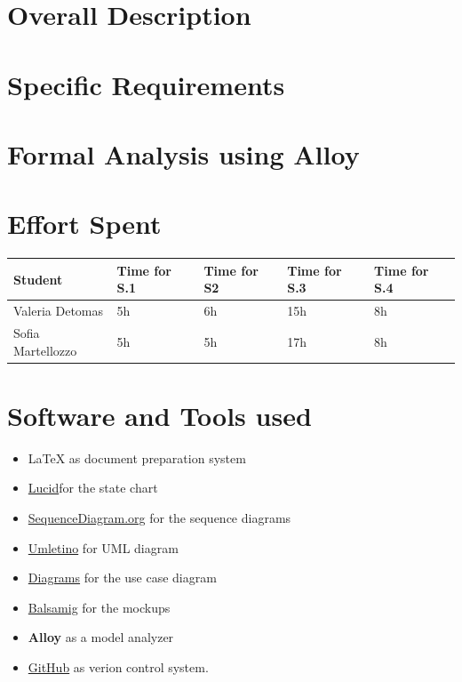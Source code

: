 \documentclass{article}
\begin{document}
\newpage
\section{Overall Description}


\newpage
\section{Specific Requirements}


\newpage
\section{Formal Analysis using Alloy}



\newpage 
\section{Effort Spent}
\begin{table}[h]
      \centering
      \begin{tabular}{|p{3cm}||p{2cm}|p{2cm}|p{2cm}|p{2cm}|}
            \hline
            Student & Time for S.1 & Time for S2 & Time for S.3 & Time for S.4\\
            \hline
            Valeria Detomas & 5h & 6h & 15h & 8h\\
            \hline
            Sofia Martellozzo & 5h & 5h & 17h & 8h\\
            \hline
      \end{tabular}
\end{table}

\section{Software and Tools used}
\begin{itemize}
      \item \LaTeX{} as document preparation system
      \item \href{https://lucid.co/}{Lucid}for the state chart 
      \item \href{https://sequencediagram.org}{SequenceDiagram.org} for the sequence diagrams
      \item \href{http://www.umletino.com/umletino.html}{Umletino} for UML diagram 
      \item \href{https://app.diagrams.net/}{Diagrams} for the use case diagram 
      \item \href{https://balsamiq.com}{Balsamig} for the mockups 
      \item \textbf{Alloy} as a model analyzer
      \item \href{https://github.com/}{GitHub} as verion control system.
\end{itemize}
\end{document}
